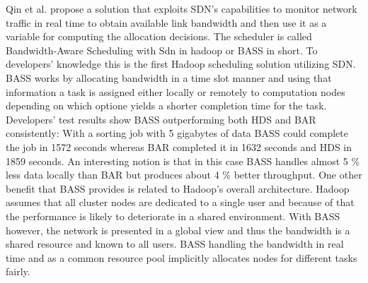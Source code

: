 \documentclass{acm_proc_article-sp}
\begin{document}
Qin et al. propose a solution that exploits SDN's capabilities to monitor network traffic in real time to obtain available link bandwidth and then use it as a variable for computing the allocation decisions. The scheduler is called Bandwidth-Aware Scheduling with Sdn in hadoop or BASS in short. To developers' knowledge this is the first Hadoop scheduling solution utilizing SDN. BASS works by allocating bandwidth in a time slot manner and using that information a task is assigned either locally or remotely to computation nodes depending on which optione yields a shorter completion time for the task. Developers' test results show BASS outperforming both HDS and BAR consistently: With a sorting job with 5 gigabytes of data BASS could complete the job in 1572 seconds whereas BAR completed it in 1632 seconds and HDS in 1859 seconds. An interesting notion is that in this case BASS handles almost 5 \% less data locally than BAR but produces about 4 \% better throughput. One other benefit that BASS provides is related to Hadoop's overall architecture. Hadoop assumes that all cluster nodes are dedicated to a single user and because of that the performance is likely to deteriorate in a shared environment. With BASS however, the network is presented in a global view and thus the bandwidth is a shared resource and known to all users. BASS handling the bandwidth in real time and as a common resource pool implicitly allocates nodes for different tasks fairly.
\end{document}
